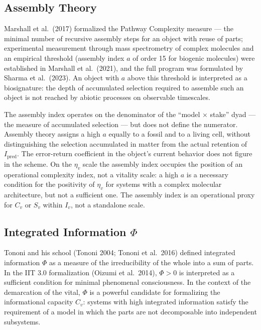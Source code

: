 \documentclass[pdflatex,sn-mathphys-ay]{sn-jnl}
\begin{document}
\subsection{Assembly Theory}\label{assembly-theory}

Marshall et al.~(2017) formalized the Pathway Complexity measure --- the minimal number of recursive assembly steps for an object with reuse of parts; experimental measurement through mass spectrometry of complex molecules and an empirical threshold (assembly index \(a\) of order 15 for biogenic molecules) were established in Marshall et al.~(2021), and the full program was formulated by Sharma et al.~(2023). An object with \(a\) above this threshold is interpreted as a biosignature: the depth of accumulated selection required to assemble such an object is not reached by abiotic processes on observable timescales.

The assembly index operates on the denominator of the ``model × stake'' dyad --- the measure of accumulated selection --- but does not define the numerator. Assembly theory assigns a high \(a\) equally to a fossil and to a living cell, without distinguishing the selection accumulated in matter from the actual retention of \(I_{\text{pred}}\). The error-return coefficient in the object's current behavior does not figure in the scheme. On the \(\eta_v\) scale the assembly index occupies the position of an operational complexity index, not a vitality scale: a high \(a\) is a necessary condition for the positivity of \(\eta_v\) for systems with a complex molecular architecture, but not a sufficient one. The assembly index is an operational proxy for \(C_v\) or \(S_v\) within \(I_v\), not a standalone scale.

\subsection{\texorpdfstring{Integrated Information \(\Phi\)}{Integrated Information \textbackslash Phi}}\label{integrated-information-phi}

Tononi and his school (Tononi 2004; Tononi et al.~2016) defined integrated information \(\Phi\) as a measure of the irreducibility of the whole into a sum of parts. In the IIT 3.0 formalization (Oizumi et al.~2014), \(\Phi > 0\) is interpreted as a sufficient condition for minimal phenomenal consciousness. In the context of the demarcation of the vital, \(\Phi\) is a powerful candidate for formalizing the informational capacity \(C_v\): systems with high integrated information satisfy the requirement of a model in which the parts are not decomposable into independent subsystems.
\end{document}
